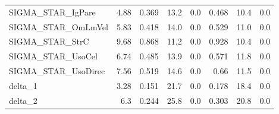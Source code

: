 \begin{tabular}{lrrrrrrr}
SIGMA\_STAR\_IgPare   &   4.88 &    0.369 &    13.2 &      0.0 &         0.468 &         10.4 &           0.0 \\
SIGMA\_STAR\_OmLmVel  &   5.83 &    0.418 &    14.0 &      0.0 &         0.529 &         11.0 &           0.0 \\
SIGMA\_STAR\_StrC     &   9.68 &    0.868 &    11.2 &      0.0 &         0.928 &         10.4 &           0.0 \\
SIGMA\_STAR\_UsoCel   &   6.74 &    0.485 &    13.9 &      0.0 &         0.571 &         11.8 &           0.0 \\
SIGMA\_STAR\_UsoDirec &   7.56 &    0.519 &    14.6 &      0.0 &          0.66 &         11.5 &           0.0 \\
delta\_1             &   3.28 &    0.151 &    21.7 &      0.0 &         0.178 &         18.4 &           0.0 \\
delta\_2             &    6.3 &    0.244 &    25.8 &      0.0 &         0.303 &         20.8 &           0.0 \\
\bottomrule
\end{tabular}


